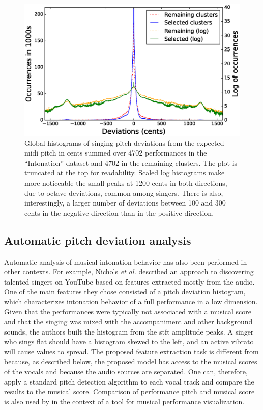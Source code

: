 \begin{figure}[h!]
    \centering
    \includegraphics[width=\textwidth]{figures/full_histograms_comparison.eps}
    \caption{Global histograms of singing pitch deviations from the expected \gls{midi} pitch in cents summed over 4702 performances in the ``Intonation'' dataset and 4702 in the remaining clusters. The plot is truncated at the top for readability. Scaled log histograms make more noticeable the small peaks at 1200 cents in both directions, due to octave deviations, common among singers. There is also, interestingly, a larger number of deviations between 100 and 300 cents in the negative direction than in the positive direction.}
    \label{fig:full_hist}
\end{figure}

\subsection{Automatic pitch deviation analysis}
Automatic analysis of musical intonation behavior has also been performed in other contexts. For example, Nichols \textit{et al.} \cite{nichols2012automatically} described an approach to discovering talented singers on YouTube based on features extracted mostly from the audio. One of the main features they chose consisted of a pitch deviation histogram, which characterizes intonation behavior of a full performance in a low dimension. Given that the performances were typically not associated with a musical score and that the singing was mixed with the accompaniment and other background sounds, the authors built the histogram from the \gls{stft} amplitude peaks. A singer who sings flat should have a histogram skewed to the left, and an active vibrato will cause values to spread. The proposed feature extraction task is different from \cite{nichols2012automatically} because, as described below, the proposed model has access to the musical scores of the vocals and because the audio sources are separated. One can, therefore, apply a standard pitch detection algorithm to each vocal track and compare the results to the musical score. Comparison of performance pitch and musical score is also used by \cite{lim2010intune} in the context of a tool for musical performance visualization.


